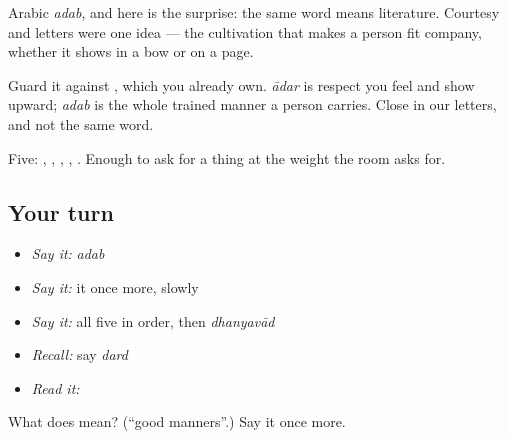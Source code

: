 Arabic \emph{adab}, and here is the surprise: the same word means literature. Courtesy and letters were one idea — the cultivation that makes a person fit company, whether it shows in a bow or on a page.

Guard it against , which you already own. \emph{ādar} is respect you feel and show upward; \emph{adab} is the whole trained manner a person carries. Close in our letters, and not the same word.

\begin{grammarlens}[title={What you've built}]
Five: , , , , . Enough to ask for a thing at the weight the room asks for.
\end{grammarlens}

\subsection*{Your turn}
\begin{itemize}
\raggedright
  \item \emph{Say it:} \emph{adab}
  \item \emph{Say it:} it once more, slowly
  \item \emph{Say it:} all five in order, then \emph{dhanyavād}
  \item \emph{Recall:} say \emph{dard}
  \item \emph{Read it:} \textbf{}
\end{itemize}

\begin{tcolorbox}[breakable,colback=teal!4,colframe=teal!35!black,title={Before you move on}]
What does  mean? (\textquotedblleft{}good manners\textquotedblright{}.) Say it once more.
\end{tcolorbox}
